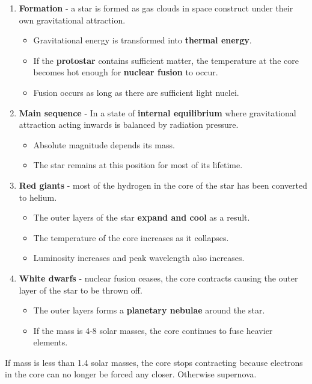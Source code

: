 \begin{enumerate}
    \item \textbf{Formation} - a star is formed as gas clouds in space construct under their own gravitational attraction.
        \begin{itemize}
            \item Gravitational energy is transformed into \textbf{thermal energy}.
            \item If the \textbf{protostar} contains sufficient matter, the temperature at the core becomes hot enough for \textbf{nuclear fusion} to occur.
            \item Fusion occurs as long as there are sufficient light nuclei.
        \end{itemize}
    \item \textbf{Main sequence} - In a state of \textbf{internal equilibrium} where gravitational attraction acting inwards is balanced by radiation pressure.
        \begin{itemize}
            \item Absolute magnitude depends its mass.
            \item The star remains at this position for most of its lifetime.
        \end{itemize}
    \item \textbf{Red giants} - most of the hydrogen in the core of the star has been converted to helium.
        \begin{itemize}
            \item The outer layers of the star \textbf{expand and cool} as a result.
            \item The temperature of the core increases as it collapses.
            \item Luminosity increases and peak wavelength also increases.
        \end{itemize}
    \item \textbf{White dwarfs} - nuclear fusion ceases, the core contracts causing the outer layer of the star to be thrown off.
        \begin{itemize}
            \item The outer layers forms a \textbf{planetary nebulae} around the star.
            \item If the mass is 4-8 solar masses, the core continues to fuse heavier elements.
        \end{itemize}
\end{enumerate}

If mass is less than 1.4 solar masses, the core stops contracting because electrons in the core can no longer be forced any closer. Otherwise supernova.

